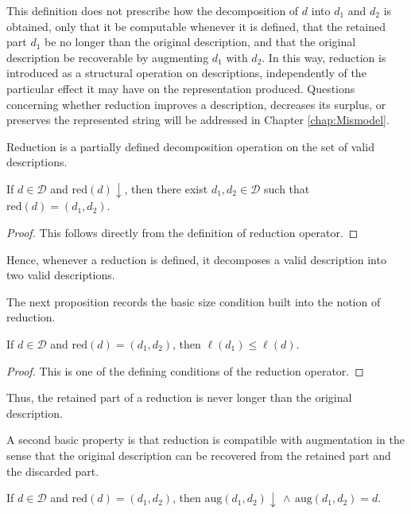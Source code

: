 This definition does not prescribe how the decomposition of \(d\) into \(d_1\) and \(d_2\) is obtained, only that it be computable whenever it is defined, that the retained part \(d_1\) be no longer than the original description, and that the original description be recoverable by augmenting \(d_1\) with \(d_2\). In this way, reduction is introduced as a structural operation on descriptions, independently of the particular effect it may have on the representation produced. Questions concerning whether reduction improves a description, decreases its surplus, or preserves the represented string will be addressed in Chapter \ref{chap:Mismodel}.

Reduction is a partially defined decomposition operation on the set of valid descriptions.

\begin{proposition}
\label{prop:reduction_components_valid}
If $d \in \mathcal{D}$ and $\mathrm{red}(d)\downarrow$, then there exist $d_1, d_2 \in \mathcal{D}$ such that $\mathrm{red}(d)=(d_1,d_2)$.
\end{proposition}
\begin{proof}
This follows directly from the definition of reduction operator.
\end{proof}

Hence, whenever a reduction is defined, it decomposes a valid description into two valid descriptions.

The next proposition records the basic size condition built into the notion of reduction.

\begin{proposition}
\label{prop:reduction_not_longer}
If \(d \in \mathcal{D}\) and \(\mathrm{red}(d)=(d_1,d_2)\), then $\ell(d_1)\leq \ell(d)$.
\end{proposition}
\begin{proof}
This is one of the defining conditions of the reduction operator.
\end{proof}

Thus, the retained part of a reduction is never longer than the original description.

A second basic property is that reduction is compatible with augmentation in the sense that the original description can be recovered from the retained part and the discarded part.

\begin{proposition}
\label{prop:reduction_aug_reconstructs}
If \(d \in \mathcal{D}\) and \(\mathrm{red}(d)=(d_1,d_2)\), then $\mathrm{aug}(d_1, d_2) \downarrow \, \land \, \mathrm{aug}(d_1,d_2)=d$.
\end{proposition}

